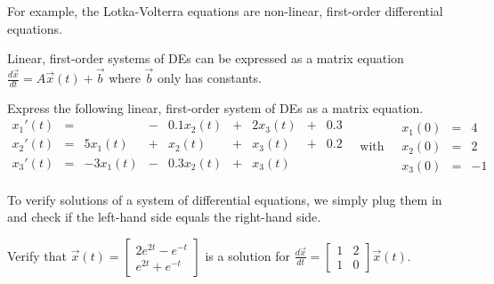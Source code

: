 \documentclass[../main.tex]{subfiles}
\begin{document}
For example, the Lotka-Volterra  equations are non-linear, first-order differential equations.
\clearpage

Linear, first-order systems of DEs can be expressed as a matrix equation \(\frac{d \vec{x}}{dt} = A \vec{x}(t) + \vec{b}\) where \(\vec{b}\) only has constants.

\begin{example} \label{ex:system-de-to-matrix}
  Express the following linear, first-order system of DEs as a matrix equation.
  \[
     \begin{array}{rcrcrcrcr}
       x_{1}'(t) &=&              &-& 0.1 x_{2}(t) &+& 2 x_{3}(t) &+& 0.3\\
       x_{2}'(t) &=&   5 x_{1}(t) &+&     x_{2}(t) &+&   x_{3}(t) &+& 0.2 \\
       x_{3}'(t) &=&  -3 x_{1}(t) &-& 0.3 x_{2}(t) &+&   x_{3}(t) \\
     \end{array}
     \quad\text{with}\quad
     \begin{array}{rcr}
      x_{1}(0) &=& 4 \\
      x_{2}(0) &=& 2 \\
      x_{3}(0) &=& -1
     \end{array}
  \]

\end{example}

To verify solutions of a system of differential equations, we simply plug them in and check if the left-hand side equals the right-hand side.
\begin{example} \label{ex:system-de-verify-solution}
  Verify that \(\vec{x}(t) = \begin{bmatrix} 2 e^{2t} - e^{-t} \\ e^{2t} + e^{-t} \end{bmatrix}\) is a solution for \(\frac{d\vec{x}}{dt} = \begin{bmatrix} 1 & 2 \\ 1 & 0 \end{bmatrix} \vec{x}(t)\).

\end{example}

\end{document}
